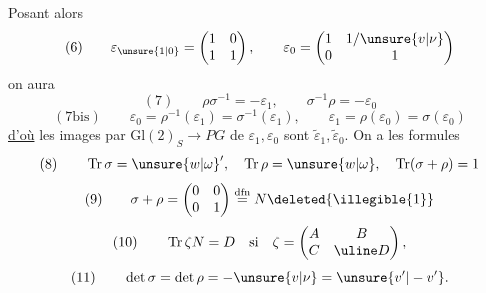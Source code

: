 Posant alors
\[
(6)\qquad \varepsilon_{\unsure{1|0}}=\begin{pmatrix}1&0\\1&1\end{pmatrix},\qquad \varepsilon_0=\begin{pmatrix}1&1/\unsure{v|\nu}\\0&1\end{pmatrix}
\]
on aura
\[
(7)\qquad \rho\sigma^{-1}=-\varepsilon_1,\qquad\sigma^{-1}\rho=-\varepsilon_0
\]
\[
(7\mathrm{bis})\qquad \varepsilon_0=\rho^{-1}(\varepsilon_1)=\sigma^{-1}(\varepsilon_1),\qquad\varepsilon_1=\rho(\varepsilon_0)=\sigma(\varepsilon_0)
\]
\uline{d'où} les images par $\mathrm{Gl}(2)_S\longrightarrow PG$ de  $\varepsilon_1,\varepsilon_0$ sont $\widetilde\varepsilon_1,\widetilde\varepsilon_0$. On a les formules
\[
(8)\qquad \operatorname{Tr}\sigma=\unsure{w|\omega}',\quad\operatorname{Tr}\rho=\unsure{w|\omega},\quad\operatorname{Tr}(\sigma+\rho)=1
\]
\[
(9)\qquad \sigma+\rho=\begin{pmatrix}0&0\\0&1\end{pmatrix}\overset{\mathrm{dfn}}=N\deleted{\illegible{1}}
\]
\[
(10)\qquad \operatorname{Tr}\zeta N=D\quad\text{si}\quad\zeta=\begin{pmatrix}A&B\\C&\uline D\end{pmatrix},
\]
\[
(11)\qquad \det\sigma=\det\rho=-\unsure{v|\nu}=\unsure{v'|-v'}.
\]

